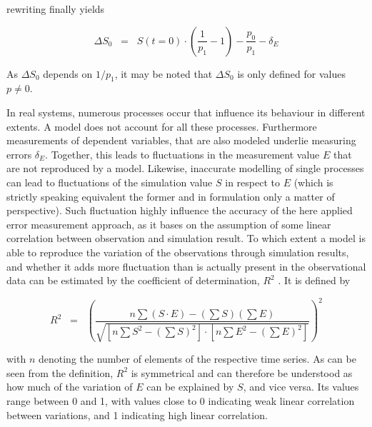 \noindent rewriting finally yields

\begin{equation}
    \label{Eq-ErrMethDS0}
    \Delta S_0 \; \; = \; \; S(t\!=\!0) \cdot \left( \frac{1}{p_1} - 1 \right) - \frac{p_0}{p_1} - \delta_E
\end{equation}

As $\Delta S_0$ depends on $1/p_1$, it may be noted that $\Delta S_0$ is only defined for values $p \neq 0$.

In real systems, numerous processes occur that influence its behaviour in different extents. A model does not account for all these processes. Furthermore measurements of dependent variables, that are also modeled underlie measuring errors $\delta_E$. Together, this leads to fluctuations in the measurement value $E$ that are not reproduced by a model. Likewise, inaccurate modelling of single processes can lead to fluctuations of the simulation value $S$ in respect to $E$ (which is strictly speaking equivalent the former and in formulation only a matter of perspective). Such fluctuation highly influence the accuracy of the here applied error measurement approach, as it bases on the assumption of some linear correlation between observation and simulation result. To which extent a model is able to reproduce the variation of the observations through simulation results, and whether it adds more fluctuation than is actually present in the observational data can be estimated by the coefficient of determination, $R^2$ \parencite{Mosteller.1977}. It is defined by

\begin{equation}
    \label{Eq-R2}
    R^2 \; \; = \; \; \left( \frac{ n \sum (S \cdot E) - (\sum S) (\sum E) }{ \sqrt{ [ n \sum S^2 - (\sum S)^2 ] \cdot [ n \sum E^2 - (\sum E)^2 ] } } \right)^2
\end{equation}

with $n$ denoting the number of elements of the respective time series. As can be seen from the definition, $R^2$ is symmetrical and can therefore be understood as how much of the variation of $E$ can be explained by $S$, and vice versa. Its values range between 0 and 1, with values close to 0 indicating weak linear correlation between variations, and 1 indicating high linear correlation.

